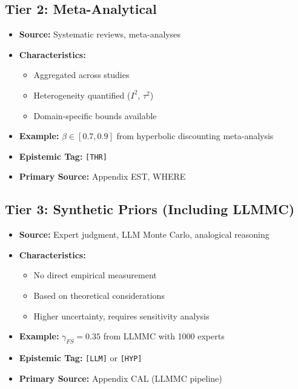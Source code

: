 \subsection{Tier 2: Meta-Analytical}

\begin{itemize}[nosep]
    \item \textbf{Source:} Systematic reviews, meta-analyses
    \item \textbf{Characteristics:}
        \begin{itemize}[nosep]
            \item Aggregated across studies
            \item Heterogeneity quantified ($I^2$, $\tau^2$)
            \item Domain-specific bounds available
        \end{itemize}
    \item \textbf{Example:} $\beta \in [0.7, 0.9]$ from hyperbolic discounting meta-analysis
    \item \textbf{Epistemic Tag:} \texttt{[THR]}
    \item \textbf{Primary Source:} Appendix EST, WHERE
\end{itemize}

\subsection{Tier 3: Synthetic Priors (Including LLMMC)}

\begin{itemize}[nosep]
    \item \textbf{Source:} Expert judgment, LLM Monte Carlo, analogical reasoning
    \item \textbf{Characteristics:}
        \begin{itemize}[nosep]
            \item No direct empirical measurement
            \item Based on theoretical considerations
            \item Higher uncertainty, requires sensitivity analysis
        \end{itemize}
    \item \textbf{Example:} $\gamma_{FS} = 0.35$ from LLMMC with 1000 experts
    \item \textbf{Epistemic Tag:} \texttt{[LLM]} or \texttt{[HYP]}
    \item \textbf{Primary Source:} Appendix CAL (LLMMC pipeline)
\end{itemize}

